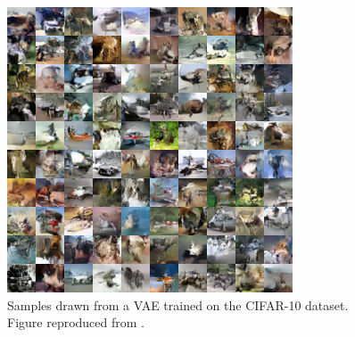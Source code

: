 \begin{figure}
  \centering
  \includegraphics[width=\textwidth]{cifar_vae}
  \caption{Samples drawn from a VAE trained on the CIFAR-10 dataset.
    Figure reproduced from \citet{kingma2016improving}.
  }
  \label{fig:vae_samples}
\end{figure}

